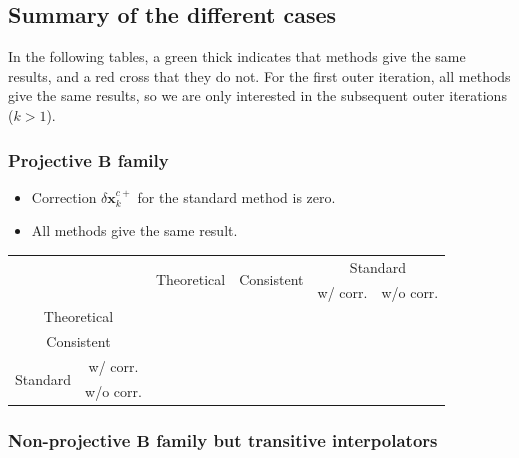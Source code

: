 \documentclass[12pt]{scrartcl}
\newcommand{\cmark}{\ding{51}}%
\newcommand{\xmark}{\ding{55}}%
\begin{document}
\subsection{Summary of the different cases}

In the following tables, a green thick \textcolor{green}{\cmark} indicates that methods give the same results, and a red cross \textcolor{red}{\xmark} that they do not. For the first outer iteration, all methods give the same results, so we are only interested in the subsequent outer iterations ($k>1$).

\subsubsection{Projective $\mathbf{B}$ family}
\begin{itemize}
\item Correction $\delta \mathbf{x}^{c+}_k$ for the standard method is zero.
\item All methods give the same result.
\end{itemize}

\begin{center}
\begin{adjustbox}{max width=\textwidth}
\begin{tabular}{cc|c|c|c|c}
 & & \multirow{2}{*}{Theoretical} & \multirow{2}{*}{Consistent} & \multicolumn{2}{c}{Standard} \\
& & & & w/ corr.& w/o corr. \\
\hline
\multicolumn{2}{c|}{Theoretical} & \textcolor{green}{\cmark} & \textcolor{green}{\cmark} & \textcolor{green}{\cmark} & \textcolor{green}{\cmark} \\
\hline
\multicolumn{2}{c|}{Consistent} & \textcolor{green}{\cmark} & \textcolor{green}{\cmark} & \textcolor{green}{\cmark} & \textcolor{green}{\cmark} \\
\hline
\multirow{2}{*}{Standard} & w/ corr. & \textcolor{green}{\cmark} & \textcolor{green}{\cmark} & \textcolor{green}{\cmark} & \textcolor{green}{\cmark} \\
\cline{2-6}
 & w/o corr. & \textcolor{green}{\cmark} & \textcolor{green}{\cmark} & \textcolor{green}{\cmark} & \textcolor{green}{\cmark} \\
\hline
\end{tabular}
\end{adjustbox}
\end{center}

\subsubsection{Non-projective $\mathbf{B}$ family but transitive interpolators}
\end{document}
